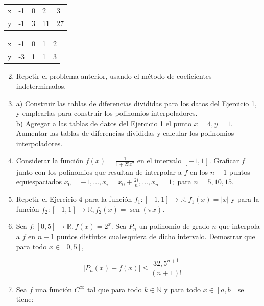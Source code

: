 \documentclass[10pt]{book}
\begin{document}
\begin{center}
\begin{tabular}{l|l|l|l|l|}
\hline
x & -1 & 0 & 2 & 3 \\
y & -1 & 3 & 11 & 27 \\
\hline
\end{tabular}
\end{center}

\begin{center}
\begin{tabular}{|l|l|l|l|l|}
\hline
x & -1 & 0 & 1 & 2 \\
y & -3 & 1 & 1 & 3 \\
\hline
\end{tabular}
\end{center}

\begin{enumerate}
  \setcounter{enumi}{1}
  \item Repetir el problema anterior, usando el método de coeficientes indeterminados.
  \item a) Construir las tablas de diferencias divididas para los datos del Ejercicio 1, y emplearlas para construir los polinomios interpoladores.\\
b) Agregar a las tablas de datos del Ejercicio 1 el punto $x=4, y=1$. Aumentar las tablas de diferencias divididas y calcular los polinomios interpoladores.
  \item Considerar la función $f(x)=\frac{1}{1+25 x^{2}}$ en el intervalo $[-1,1]$. Graficar $f$ junto con los polinomios que resultan de interpolar a $f$ en los $n+1$ puntos equiespaciados $x_{0}= -1, \ldots, x_{i}=x_{0}+\frac{2 i}{n}, \ldots, x_{n}=1 ;$ para $n=5,10,15$.
  \item Repetir el Ejercicio 4 para la función $f_{1}:[-1,1] \rightarrow \mathbb{R}, f_{1}(x)=|x|$ y para la función $f_{2}:[-1,1] \rightarrow \mathbb{R}, f_{2}(x)=\operatorname{sen}(\pi x)$.
  \item Sea $f:[0,5] \rightarrow \mathbb{R}, f(x)=2^{x}$. Sea $P_{n}$ un polinomio de grado $n$ que interpola a $f$ en $n+1$ puntos distintos cualesquiera de dicho intervalo. Demostrar que para todo $x \in[0,5]$,
\end{enumerate}

$$
\left|P_{n}(x)-f(x)\right| \leq \frac{32,5^{n+1}}{(n+1)!}
$$

\begin{enumerate}
  \setcounter{enumi}{6}
  \item Sea $f$ una función $C^{\infty}$ tal que para todo $k \in \mathbb{N}$ y para todo $x \in[a, b]$ se tiene:
\end{enumerate}
\end{document}
